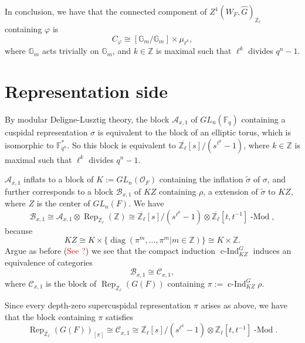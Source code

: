 \documentclass{article}
\newcommand{\red}[1]{\textcolor{red}{#1}}
\DeclareMathOperator{\cInd}{\operatorname{c-Ind}}
\newcommand{\Rep}{\operatorname{Rep}}
\newcommand{\diag}{\operatorname{diag}}
\newcommand{\Modl}{\operatorname{-Mod}}
\begin{document}
In conclusion, we have that the connected component of $Z^1(W_F, \hat{G})_{\overline{\mathbb{Z}_{\ell}}}$ containing $\varphi$ is
$$C_{\varphi} \cong [\mathbb{G}_m/\mathbb{G}_m] \times \mu_{\ell^k},$$
where $\mathbb{G}_m$ acts trivially on $\mathbb{G}_m$, and $k \in \mathbb{Z}$ is maximal such that $\ell^k$ divides $q^n-1$.


\section{Representation side}

By modular Deligne-Lusztig theory, the block $\mathcal{A}_{x,1}$ of $GL_n(\mathbb{F}_q)$ containing a cuspidal representation $\sigma$ is equivalent to the block of an elliptic torus, which is isomorphic to $\mathbb{F}_{q^n}^*$. So this block is equivalent to $\overline{\mathbb{Z}_{\ell}}[s]/(s^{\ell^k}-1)$, where $k \in \mathbb{Z}$ is maximal such that $\ell^k$ divides $q^n-1$.

$\mathcal{A}_{x,1}$ inflats to a block of $K:=GL_n(\mathcal{O}_F)$ containing the inflation $\tilde{\sigma}$ of $\sigma$, and further corresponds to a block $\mathcal{B}_{x,1}$ of $KZ$ containing $\rho$, a extension of $\tilde{\sigma}$ to $KZ$, where $Z$ is the center of $GL_n(F)$. We have
$$\mathcal{B}_{x,1} \cong \mathcal{A}_{x,1} \otimes \Rep_{\overline{\mathbb{Z}_{\ell}}}(\mathbb{Z}) \cong \overline{\mathbb{Z}_{\ell}}[s]/(s^{\ell^k}-1) \otimes \overline{\mathbb{Z}_{\ell}}[t, t^{-1}]\Modl,$$
because
$$KZ \cong K \times \{\diag(\pi^m, ..., \pi^m | m \in \mathbb{Z})\} \cong K \times \mathbb{Z}.$$
Argue as before (\red{See ?}) we see that the compact induction $\cInd_{KZ}^G$ induces an equivalence of categories
$$\mathcal{B}_{x,1} \cong \mathcal{C}_{x,1},$$
where $\mathcal{C}_{x,1}$ is the block of $\Rep_{\overline{\mathbb{Z}_{\ell}}}(G(F))$ containing $\pi:=\cInd_{KZ}^G\rho$.

Since every depth-zero supercuspidal representation $\pi$ arises as above, we have that the block containing $\pi$ satisfies
$$\Rep_{\overline{\mathbb{Z}_{\ell}}}(G(F))_{[\pi]} \cong \mathcal{C}_{x,1} \cong \overline{\mathbb{Z}_{\ell}}[s]/(s^{\ell^k}-1) \otimes \overline{\mathbb{Z}_{\ell}}[t, t^{-1}]\Modl.$$



\pagebreak
\end{document}
